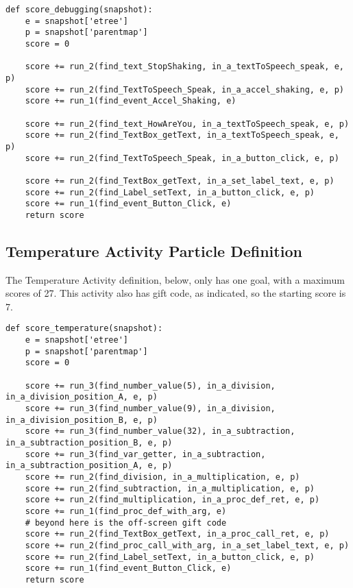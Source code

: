 \begin{verbatim}
def score_debugging(snapshot):
    e = snapshot['etree']
    p = snapshot['parentmap']
    score = 0

    score += run_2(find_text_StopShaking, in_a_textToSpeech_speak, e, p)
    score += run_2(find_TextToSpeech_Speak, in_a_accel_shaking, e, p)
    score += run_1(find_event_Accel_Shaking, e)

    score += run_2(find_text_HowAreYou, in_a_textToSpeech_speak, e, p)
    score += run_2(find_TextBox_getText, in_a_textToSpeech_speak, e, p)
    score += run_2(find_TextToSpeech_Speak, in_a_button_click, e, p)

    score += run_2(find_TextBox_getText, in_a_set_label_text, e, p)
    score += run_2(find_Label_setText, in_a_button_click, e, p)
    score += run_1(find_event_Button_Click, e)
    return score
\end{verbatim}
\label{lst:debugging_test_definition}

\subsection{Temperature Activity Particle Definition}
The Temperature Activity definition, below, %
only has one goal, with a maximum scores of 27. This activity also has gift code, as indicated, so the starting score is 7. 

\begin{verbatim}
def score_temperature(snapshot):
    e = snapshot['etree']
    p = snapshot['parentmap']
    score = 0

    score += run_3(find_number_value(5), in_a_division, in_a_division_position_A, e, p)
    score += run_3(find_number_value(9), in_a_division, in_a_division_position_B, e, p)
    score += run_3(find_number_value(32), in_a_subtraction, in_a_subtraction_position_B, e, p)
    score += run_3(find_var_getter, in_a_subtraction, in_a_subtraction_position_A, e, p)
    score += run_2(find_division, in_a_multiplication, e, p)
    score += run_2(find_subtraction, in_a_multiplication, e, p)
    score += run_2(find_multiplication, in_a_proc_def_ret, e, p)
    score += run_1(find_proc_def_with_arg, e)
    # beyond here is the off-screen gift code
    score += run_2(find_TextBox_getText, in_a_proc_call_ret, e, p)
    score += run_2(find_proc_call_with_arg, in_a_set_label_text, e, p)
    score += run_2(find_Label_setText, in_a_button_click, e, p)
    score += run_1(find_event_Button_Click, e)
    return score
\end{verbatim}
\label{lst:temperature_test_definition}


